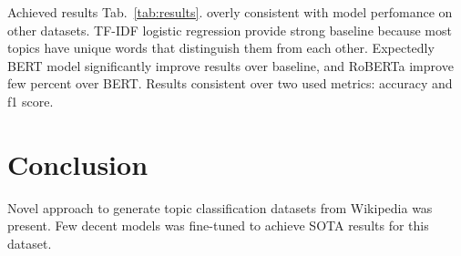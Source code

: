 \documentclass{article}
\begin{document}
Achieved results Tab.~\ref{tab:results}. overly consistent with model perfomance on other datasets. TF-IDF logistic regression provide strong baseline because most topics have unique words that distinguish them from each other. Expectedly BERT model significantly improve results over baseline, and RoBERTa improve
few percent over BERT. Results consistent over two used metrics: accuracy and f1 score.

\section{Conclusion}
Novel approach to generate topic classification datasets from Wikipedia was present. Few decent models was fine-tuned to achieve SOTA results for this dataset.



\end{document}
